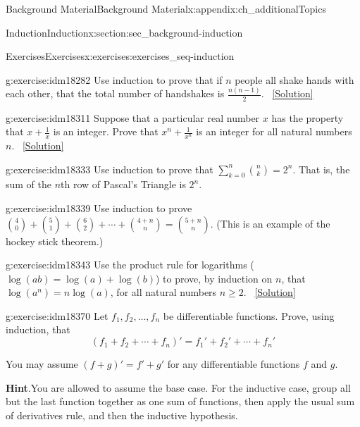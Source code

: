 \documentclass[oneside,10pt,]{book}
\numberwithin{equation}{chapter}
\def\d{\displaystyle}
\begin{document}
\begin{appendixptx}{Background Material}{}{Background Material}{}{}{x:appendix:ch_additionalTopics}
\begin{sectionptx}{Induction}{}{Induction}{}{}{x:section:sec_background-induction}
\begin{exercises-subsection}{Exercises}{}{Exercises}{}{}{x:exercises:exercises_seq-induction}
\begin{divisionexercise}{17}{}{}{g:exercise:idm18282}%
Use induction to prove that if \(n\) people all shake hands with each other, that the total number of handshakes is \(\frac{n(n-1)}{2}\).%
\qquad~\hfill{\tiny\hyperlink{g:solution:idm18287-main}{[Solution]}}\end{divisionexercise}%
\begin{divisionexercise}{18}{}{}{g:exercise:idm18311}%
Suppose that a particular real number \(x\) has the property that \(x + \frac{1}{x}\) is an integer. Prove that \(x^n + \frac{1}{x^n}\) is an integer for all natural numbers \(n\).%
\qquad~\hfill{\tiny\hyperlink{g:solution:idm18318-main}{[Solution]}}\end{divisionexercise}%
\begin{divisionexercise}{19}{}{}{g:exercise:idm18333}%
Use induction to prove that \(\d\sum_{k=0}^n {n \choose k} = 2^n\). That is, the sum of the \(n\)th row of Pascal's Triangle is \(2^n\).%
\end{divisionexercise}%
\begin{divisionexercise}{20}{}{}{g:exercise:idm18339}%
Use induction to prove \({4 \choose 0} + {5 \choose 1} + {6 \choose 2} + \cdots + {4+n \choose n} = {5+n \choose n}\). (This is an example of the hockey stick theorem.)%
\end{divisionexercise}%
\begin{divisionexercise}{21}{}{}{g:exercise:idm18343}%
Use the product rule for logarithms (\(\log(ab) = \log(a) + \log(b)\)) to prove, by induction on \(n\), that \(\log(a^n) = n \log(a)\), for all natural numbers \(n \ge 2\).%
\qquad~\hfill{\tiny\hyperlink{g:solution:idm18350-main}{[Solution]}}\end{divisionexercise}%
\begin{divisionexercise}{22}{}{}{g:exercise:idm18370}%
Let \(f_1, f_2,\ldots, f_n\) be differentiable functions. Prove, using induction, that%
\begin{equation*}
(f_1 + f_2 + \cdots + f_n)' = f_1' + f_2' + \cdots + f_n'
\end{equation*}
%
\par
You may assume \((f+g)' = f' + g'\) for any differentiable functions \(f\) and \(g\).%
\par\smallskip%
\noindent\textbf{Hint}.\hypertarget{g:hint:idm18379}{}\quad{}You are allowed to assume the base case. For the inductive case, group all but the last function together as one sum of functions, then apply the usual sum of derivatives rule, and then the inductive hypothesis.%

\end{divisionexercise}
\end{exercises-subsection}
\end{sectionptx}
\end{appendixptx}
\end{document}
